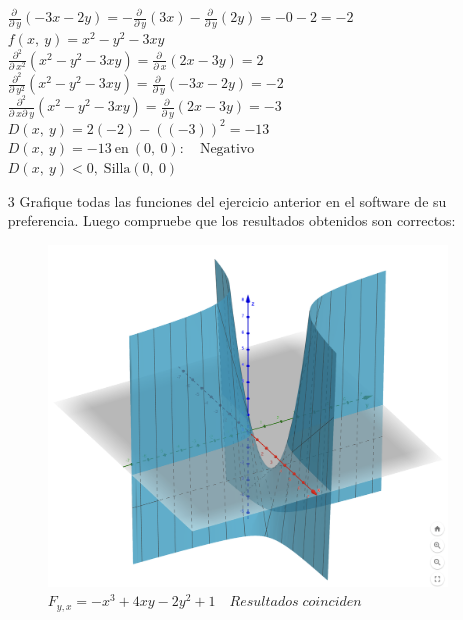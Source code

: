 \documentclass[13pt]{memoir}
\begin{document}
\begin{enumerate}
$\frac{\partial \:}{\partial \:y}\left(-3x-2y\right) =-\frac{\partial \:}{\partial \:y}\left(3x\right)-\frac{\partial \:}{\partial \:y}\left(2y\right) =-0-2 =-2$\\ 

$f\left(x,\:y\right)=x^2-y^2-3xy$\\ 
$\frac{\partial ^2}{\partial \:x^2}\left(x^2-y^2-3xy\right) =\frac{\partial \:}{\partial \:x}\left(2x-3y\right) =2$ \\ 
$\frac{\partial ^2}{\partial \:y^2}\left(x^2-y^2-3xy\right) =\frac{\partial \:}{\partial \:y}\left(-3x-2y\right) =-2$ \\ 
$\frac{\partial ^2}{\partial \:x\partial \:y}\left(x^2-y^2-3xy\right) =\frac{\partial \:}{\partial \:y}\left(2x-3y\right) =-3$\\ 

$D\left(x,\:y\right)=2\left(-2\right)-\left(\left(-3\right)\right)^2 =-13$\\ 

$D\left(x,\:y\right)=-13\mathrm{\:en\:}\left(0,\:0\right):\quad \mathrm{Negativo}$ \\ 
$D\left(x,\:y\right)<0, \; \mathrm{Silla}\left(0,\:0\right)$

\item[ 3] Grafique todas las funciones del ejercicio anterior en el software de su preferencia. Luego compruebe que los resultados obtenidos son correctos:\\ 


\begin{figure}[h]
    \centering
    \includegraphics[scale=0.3]{assets/t_2_3.png} 
    \caption{$F_{y,x}= -x^3 + 4xy - 2y^2+1 \quad  Resultados \; coinciden$}
\end{figure}


\end{enumerate}
\end{document}
